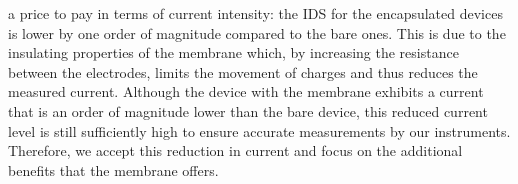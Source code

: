 a price to pay in terms of current intensity: the IDS for the encapsulated devices is lower by one order of magnitude compared to the bare ones. This is due to the insulating properties of the membrane which, by increasing the resistance between the electrodes, limits the movement of charges and thus reduces the measured current. Although the device with the membrane exhibits a current that is an order of magnitude lower than the bare device, this reduced current level is still sufficiently high to ensure accurate measurements by our instruments. Therefore, we accept this reduction in current and focus on the additional benefits that the membrane offers.
